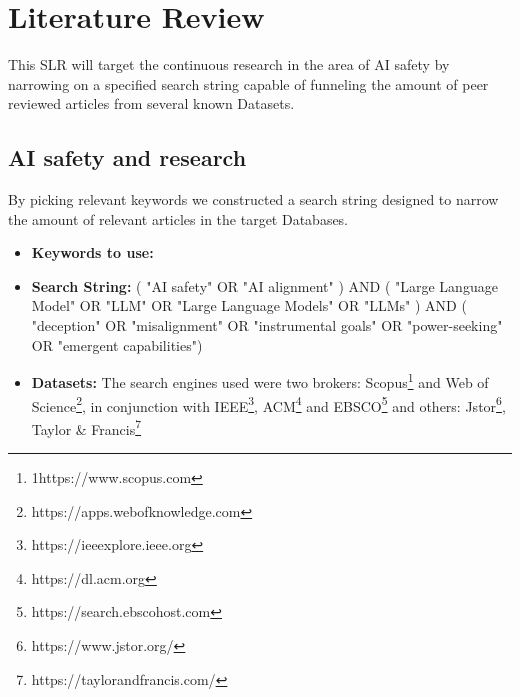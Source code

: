 \chapter{Literature Review}\label{chap:literature_review}

This SLR will target the continuous research in the area of AI safety by narrowing on a specified search string capable of funneling the amount of peer reviewed articles from several known Datasets.

\section{AI safety and research}

By picking relevant keywords we constructed a search string designed to narrow the amount of relevant articles in the target Databases.

\begin{itemize}
    \item \textbf{Keywords to use:} 
    \item \textbf{Search String:} ( "AI safety" OR "AI alignment" ) AND ( "Large Language Model" OR "LLM" OR "Large Language Models" OR "LLMs" ) AND ( "deception" OR "misalignment" OR "instrumental goals" OR "power-seeking" OR "emergent capabilities")
    \item \textbf{Datasets:} The search engines used were two brokers: Scopus\footnote{1https://www.scopus.com} and Web of Science\footnote{https://apps.webofknowledge.com}, in conjunction with IEEE\footnote{https://ieeexplore.ieee.org}, ACM\footnote{https://dl.acm.org} and EBSCO\footnote{https://search.ebscohost.com} and others: Jstor\footnote{https://www.jstor.org/}, Taylor \& Francis\footnote{https://taylorandfrancis.com/}
\end{itemize}


